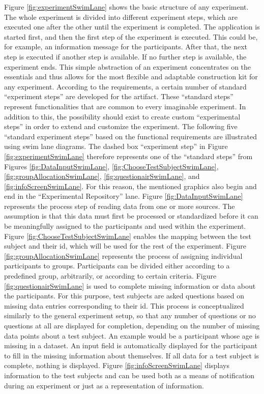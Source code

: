 Figure \ref{fig:experimentSwimLane} shows the basic structure of any experiment. The whole experiment is divided into different experiment steps, which are executed one after the other until the experiment is completed. The application is started first, and then the first step of the experiment is executed. This could be, for example, an information message for the participants. After that, the next step is executed if another step is available. If no further step is available, the experiment ends. This simple abstraction of an experiment concentrates on the essentials and thus allows for the most flexible and adaptable construction kit for any experiment. According to the requirements, a certain number of standard \enquote{experiment steps} are developed for the artifact. These \enquote{standard steps} represent functionalities that are common to every imaginable experiment. In addition to this, the possibility should exist to create custom \enquote{experimental steps} in order to extend and customize the experiment. The following five \enquote{standard experiment steps} based on the functional requirements are illustrated using swim lane diagrams. The dashed box \enquote{experiment step} in Figure \ref{fig:experimentSwimLane} therefore represents one of the \enquote{standard steps} from Figures \ref{fig:DataInputSwimLane}, \ref{fig:ChooseTestSubjectSwimLane}, \ref{fig:groupAllocationSwimLane}, \ref{fig:questionairSwimLane}, and \ref{fig:infoScreenSwimLane}. For this reason, the mentioned graphics also begin and end in the \enquote{Experimental Repository} lane. Figure \ref{fig:DataInputSwimLane} represents the process step of reading data from one or more sources. The assumption is that this data must first be processed or standardized before it can be meaningfully assigned to the participants and used within the experiment. Figure \ref{fig:ChooseTestSubjectSwimLane} enables the mapping between the test subject and their \ac{id}, which will be used for the rest of the experiment. Figure \ref{fig:groupAllocationSwimLane} represents the process of assigning individual participants to groups. Participants can be divided either according to a predefined group, arbitrarily, or according to certain criteria. Figure \ref{fig:questionairSwimLane} is used to complete missing information or data about the participants. For this purpose, test subjects are asked questions based on missing data entries corresponding to their \ac{id}. This process is conceptualized similarly to the general experiment setup, so that any number of questions or no questions at all are displayed for completion, depending on the number of missing data points about a test subject. An example would be a participant whose age is missing in a dataset. An input field is automatically displayed for the participant to fill in the missing information about themselves. If all data for a test subject is complete, nothing is displayed. Figure \ref{fig:infoScreenSwimLane} displays information to the test subjects and can be used both as a means of notification during an experiment or just as a representation of information.

